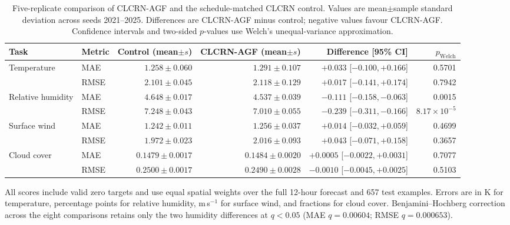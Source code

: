 \begin{table}[htbp]
\caption{Five-replicate comparison of CLCRN-AGF and the schedule-matched CLCRN control. Values are mean$\pm$sample standard deviation across seeds 2021--2025. Differences are CLCRN-AGF minus control; negative values favour CLCRN-AGF. Confidence intervals and two-sided $p$-values use Welch's unequal-variance approximation.}
\label{tab:primary}
\centering
\small
\begin{tabular}{llrrrr}
\toprule
Task & Metric & Control (mean$\pm s$) & CLCRN-AGF (mean$\pm s$) & Difference [95\% CI] & $p_{\mathrm{Welch}}$ \\
\midrule
Temperature & MAE & $1.258\pm0.060$ & $1.291\pm0.107$ & $+0.033$ [$-0.100,+0.166$] & 0.5701 \\
 & RMSE & $2.101\pm0.045$ & $2.118\pm0.129$ & $+0.017$ [$-0.141,+0.174$] & 0.7942 \\
Relative humidity & MAE & $4.648\pm0.017$ & $4.537\pm0.039$ & $-0.111$ [$-0.158,-0.063$] & 0.0015 \\
 & RMSE & $7.248\pm0.043$ & $7.010\pm0.055$ & $-0.239$ [$-0.311,-0.166$] & $8.17\times10^{-5}$ \\
Surface wind & MAE & $1.242\pm0.011$ & $1.256\pm0.037$ & $+0.014$ [$-0.032,+0.059$] & 0.4699 \\
 & RMSE & $1.972\pm0.023$ & $2.016\pm0.093$ & $+0.043$ [$-0.071,+0.158$] & 0.3657 \\
Cloud cover & MAE & $0.1479\pm0.0017$ & $0.1484\pm0.0020$ & $+0.0005$ [$-0.0022,+0.0031$] & 0.7077 \\
 & RMSE & $0.2500\pm0.0017$ & $0.2490\pm0.0028$ & $-0.0010$ [$-0.0045,+0.0025$] & 0.5103 \\
\bottomrule
\end{tabular}
\vspace{2pt}\par\parbox{\linewidth}{\footnotesize All scores include valid zero targets and use equal spatial weights over the full 12-hour forecast and 657 test examples. Errors are in K for temperature, percentage points for relative humidity, m\,s$^{-1}$ for surface wind, and fractions for cloud cover. Benjamini--Hochberg correction across the eight comparisons retains only the two humidity differences at $q<0.05$ (MAE $q=0.00604$; RMSE $q=0.000653$).}
\end{table}
